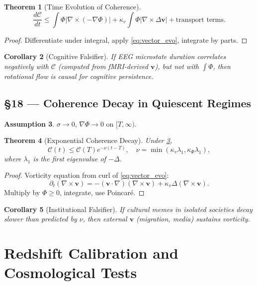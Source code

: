 \documentclass[11pt]{article}
\newtheorem{theorem}{Theorem}[section]
\newtheorem{corollary}[theorem]{Corollary}
\theoremstyle{definition}
\newtheorem{assumption}[theorem]{Assumption}
\theoremstyle{remark}
\newcommand{\vect}[1]{\bm{#1}}
\begin{document}
\begin{theorem}[Time Evolution of Coherence]
\[
\frac{d\mathcal{C}}{dt} \le \int \Phi |\nabla \times (-\nabla \Phi)| + \kappa_v \int \Phi |\nabla \times \Delta \vect{v}| + \text{transport terms}.
\]
\end{theorem}

\begin{proof}
Differentiate under integral, apply \eqref{eq:vector_evo}, integrate by parts.
\end{proof}

\begin{corollary}[Cognitive Falsifier]
If EEG microstate duration correlates negatively with $\mathcal{C}$ (computed from fMRI-derived $\vect{v}$), but not with $\int \Phi$, then rotational flow is causal for cognitive persistence.
\end{corollary}

\subsection*{§18 — Coherence Decay in Quiescent Regimes}

\begin{assumption}
\label{ass:quiescent}
$\sigma \to 0$, $\nabla \Phi \to 0$ on $[T,\infty)$.
\end{assumption}

\begin{theorem}[Exponential Coherence Decay]
Under \cref{ass:quiescent},
\[
\mathcal{C}(t) \le \mathcal{C}(T) e^{-\nu (t-T)}, \quad \nu = \min(\kappa_v \lambda_1, \kappa_\Phi \lambda_1),
\]
where $\lambda_1$ is the first eigenvalue of $-\Delta$.
\end{theorem}

\begin{proof}
Vorticity equation from curl of \eqref{eq:vector_evo}:
\[
\partial_t (\nabla \times \vect{v}) = -(\vect{v} \cdot \nabla)(\nabla \times \vect{v}) + \kappa_v \Delta (\nabla \times \vect{v}).
\]
Multiply by $\Phi \ge 0$, integrate, use Poincaré.
\end{proof}

\begin{corollary}[Institutional Falsifier]
If cultural memes in isolated societies decay slower than predicted by $\nu$, then external $\vect{v}$ (migration, media) sustains vorticity.
\end{corollary}

\section{Redshift Calibration and Cosmological Tests}
\end{document}
